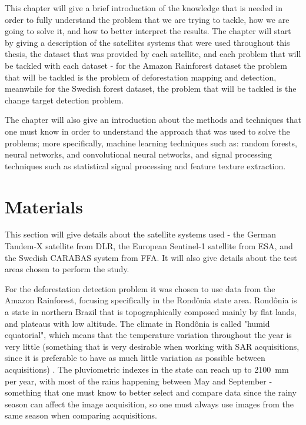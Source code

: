 This chapter will give a brief introduction of the knowledge that is needed in order to fully understand the problem that we are trying to tackle, how we are going to solve it, and how to better interpret the results. The chapter will start by giving a description of the satellites systems that were used throughout this thesis, the dataset that was provided by each satellite, and each problem that will be tackled with each dataset - for the Amazon Rainforest dataset the problem that will be tackled is the problem of deforestation mapping and detection, meanwhile for the Swedish forest dataset, the problem that will be tackled is the change target detection problem. 

The chapter will also give an introduction about the methods and techniques that one must know in order to understand the approach that was used to solve the problems; more specifically, machine learning techniques such as: random forests, neural networks, and convolutional neural networks, and signal processing techniques such as statistical signal processing and feature texture extraction.

\section{Materials}
This section will give details about the satellite systems used - the German Tandem-X satellite from DLR, the European Sentinel-1 satellite from ESA, and the Swedish CARABAS system from FFA. It will also give details about the test areas chosen to perform the study.

For the deforestation detection problem it was chosen to use data from the Amazon Rainforest, focusing specifically in the Rondônia state area. Rondônia is a state in northern Brazil that is topographically composed mainly by flat lands, and plateaus with low altitude. The climate in Rondônia is called "humid equatorial", which means that the temperature variation throughout the year is very little (something that is very desirable when working with SAR acquisitions, since it is preferable to have as much little variation as possible between acquisitions) \cite{rondoniaGeography}. The pluviometric indexes in the state can reach up to 2100 mm per year, with most of the rains happening between May and September - something that one must know to better select and compare data since the rainy season can affect the image acquisition, so one must always use images from the same season when comparing acquisitions. 

